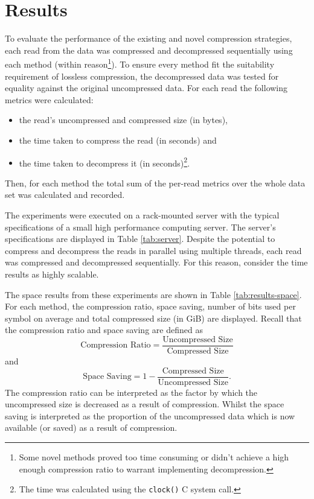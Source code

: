 \chapter{Results} \label{chap:results}



To evaluate the performance of the existing and novel compression strategies, each read
from the data was compressed and decompressed sequentially using each method
(within reason\footnote{Some novel methods proved too time consuming or didn't achieve
a high enough compression ratio to warrant implementing decompression.}).  To
ensure every method fit the suitability requirement of lossless compression, the
decompressed data was tested for equality against the original uncompressed
data.  For each read the following metrics were calculated:
\begin{itemize}
	\item the read's uncompressed and compressed size (in bytes),
	\item the time taken to compress the read (in seconds) and
	\item the time taken to decompress it (in seconds)\footnote{The time was calculated
		using the \texttt{clock()}\cite{c-clock} C system call.}.
\end{itemize}
Then, for each method the total sum of the per-read metrics over the whole data
set was calculated and recorded.

The experiments were executed on a rack-mounted server with the typical
specifications of a small high performance computing server. The server's
specifications are displayed in Table \ref{tab:server}. Despite the potential to
compress and decompress the reads in parallel using multiple threads, each read
was compressed and decompressed sequentially. For this reason, consider the time
results as highly scalable.

The space results from these experiments are shown in Table
\ref{tab:results-space}. For each method, the compression ratio, space saving,
number of bits used per symbol on average and total compressed size (in GiB) are displayed. Recall
that the compression ratio and space saving are defined as
\[ \text{Compression Ratio} = \frac{\text{Uncompressed Size}}{\text{Compressed
Size}} \]
and
\[ \text{Space Saving} = 1-\frac{\text{Compressed Size}}{\text{Uncompressed
Size}}. \]
The compression ratio can be interpreted as the factor by which the uncompressed
size is decreased as a result of compression. Whilst the space saving is
interpreted as the proportion of the uncompressed data which is now available
(or saved) as a result of compression.

